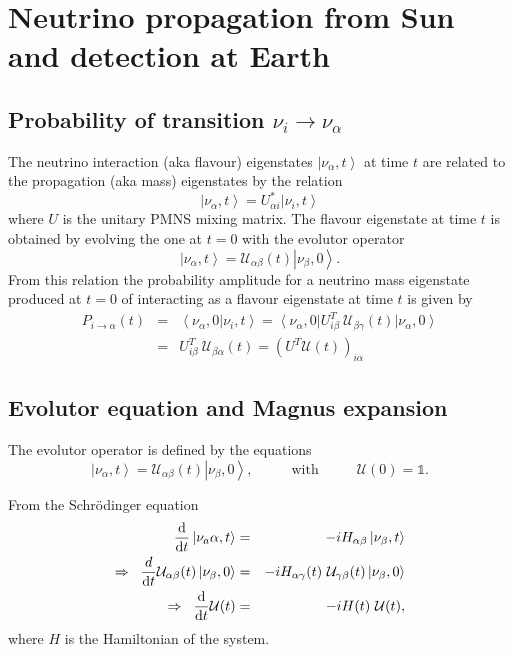 \documentclass{article}
\newcommand{\de}[0]{\text{d}}
\newcommand{\ket}[1]{\left| #1 \right>}
\newcommand{\bra}[1]{\left< #1 \right|}
\newcommand{\braket}[2]{\left< #1 | #2 \right>}
\begin{document}
\section{Neutrino propagation from Sun and detection at Earth}

\subsection{Probability of transition $\nu_i \rightarrow \nu_\alpha$}
The neutrino interaction (aka flavour) eigenstates $\ket{\nu_\alpha, t}$ at time $t$ are related to the propagation (aka mass) eigenstates by the relation
\begin{equation}
	\ket{\nu_\alpha, t} = U_{\alpha i}^* \ket{\nu_i, t}
\end{equation}
where $U$ is the unitary PMNS mixing matrix. The flavour eigenstate at time $t$ is  obtained by evolving the one at $t=0$ with the evolutor operator
\begin{equation}
	\ket{\nu_\alpha, t} = \mathcal{U}_{\alpha \beta}(t) \ket{\nu_\beta,0}.
\end{equation}
From this relation the probability amplitude for a neutrino mass eigenstate produced at $t=0$ of interacting as a flavour eigenstate at time $t$ is given by
\begin{eqnarray}
	P_{i \rightarrow \alpha}(t) &=& \braket{\nu_\alpha, 0}{\nu_i,t} = \bra{\nu_\alpha, 0} U^T_{i \beta} \ \mathcal{U}_{\beta \gamma}(t) \ket{\nu_\alpha,0} \\ 
	&=& U^T_{i\beta} \ \mathcal{U}_{\beta \alpha}(t) = \left( U^T \mathcal{U}(t) \right)_{i\alpha}
\end{eqnarray}

\subsection{Evolutor equation and Magnus expansion}

The evolutor operator is defined by the equations
\begin{equation}
	\ket{\nu_\alpha, t} = \mathcal{U}_{\alpha \beta}(t) \ket{\nu_\beta, 0}, \hspace{1cm} \text{ with } \hspace{1cm} \mathcal{U}(0) = \mathbb{1}.
\end{equation}

From the Schr{\"o}dinger equation
\begin{eqnarray}
	\frac{\de}{\de t} \ket{\nu_a\alpha, t}  &=& - i H_{\alpha \beta} \ket{\nu_\beta, t} \\
	\Rightarrow \hspace{0.2cm} \frac{d}{\de t} \mathcal{U}_{\alpha \beta} (t) \ket{\nu_\beta, 0} &=& -i H_{\alpha \gamma}(t)\ \mathcal{U}_{\gamma \beta}(t) \ket{\nu_\beta, 0} \\
	\Rightarrow \hspace{0.2cm} \frac{\de}{\de t} \mathcal{U}(t) &=& - i H(t)\ \mathcal{U}(t), \label{eq:evolutor}
\end{eqnarray}
where $H$ is the Hamiltonian of the system.
\end{document}
